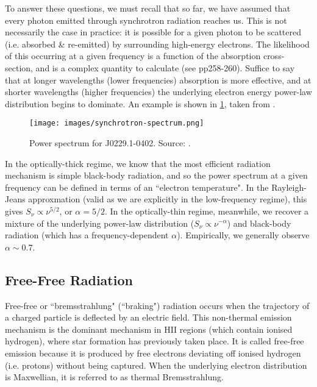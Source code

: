 \pg
To answer these questions, we must recall that so far, we have assumed that every photon emitted through synchrotron radiation reaches us. This is not necessarily the case in practice: it is possible for a given photon to be scattered (i.e. absorbed \& re-emitted) by surrounding high-energy electrons. The likelihood of this occurring at a given frequency is a function of the absorption cross-section, and is a complex quantity to calculate (see  pp258-260). Suffice to say that at longer wavelengths (lower frequencies) absorption is more effective, and at shorter wavelengths (higher frequencies) the underlying electron energy power-law  distribution begins to dominate. An example is shown in \cref{fig.synchrotron}, taken from .

\begin{figure}[!h]
\centering
\texttt{[image: images/synchrotron-spectrum.png]}
\caption{\label{fig.synchrotron} Power spectrum for J0229.1-0402. Source: .}
\end{figure}

\pg
In the optically-thick regime, we know that the most efficient radiation mechanism is simple black-body radiation, and so the power spectrum at a given frequency can be defined in terms of an ``electron temperature". In the Rayleigh-Jeans approxmation (valid as we are explicitly in the low-frequency regime), this gives $S_\nu \propto \nu^{5/2}$, or $\alpha=5/2$. 
In the optically-thin regime, meanwhile, we recover a mixture of the underlying power-law distribution ($S_\nu \propto \nu^{-\alpha}$) and black-body radiation (which has a frequency-dependent $\alpha$). Empirically, we generally observe $\alpha \sim 0.7$.


\subsection{Free-Free Radiation}
\pg
Free-free or ``bremsstrahlung" (``braking") radiation occurs when the trajectory of a charged particle is deflected by an electric field. This non-thermal emission mechanism is the dominant mechanism in HII regions (which contain ionised hydrogen), where star formation has previously taken place. It is called free-free emission because it is produced by free electrons deviating off ionised hydrogen (i.e. protons) without being captured. When the underlying electron distribution is Maxwellian, it is referred to as thermal Bremsstrahlung.


